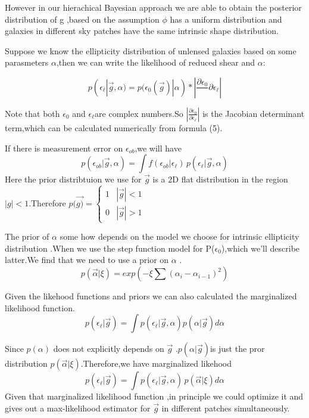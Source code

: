 \documentclass[useAMS,usenatbib]{mn2e}
\begin{document}
However in our hierachical Bayesian approach we are able to obtain
the posterior distribution of g ,based on the assumption $\phi$ has
a uniform distribution and galaxies in different sky patches have
the same intrinsic shape distribution.

Suppose we know the ellipticity distribution of unlensed galaxies
based on some parasmeters $\alpha$,then we can write the likelihood
of reduced shear and $\alpha$:

\begin{equation}
p(\epsilon_{\ell}|\vec{g},\alpha)=p(\epsilon_{0}(\vec{g})|\alpha)*|\frac{\partial\epsilon_{0}}{\,}{\partial\epsilon_{\ell}}|
\end{equation}


Note that both $\epsilon_{0}$ and $\epsilon_{\ell}$are complex numbers.So
$|\frac{\partial\epsilon_{0}}{\partial\epsilon_{\ell}}|$ is the Jacobian
determinant term,which can be calculated numerically from formula
(5).

If there is measurement error on $\epsilon_{ob}$,we will have 
\begin{equation}
p(\epsilon_{ob}|\vec{g},\alpha)=\int f(\epsilon_{ob}|\epsilon_{\ell})\, p(\epsilon_{\ell}|\vec{g},\alpha)
\end{equation}
Here the prior distribtuion we use for $\vec{g}$ is a 2D flat distribution
in the region $|g|<1$.Therefore $p(\vec{g)}=\begin{cases}
1 & |\vec{g}|<1\\
0 & |\vec{g}|>1
\end{cases}$

The prior of $\alpha$ some how depends on the model we choose for
intrinsic ellipticity distribution .When we use the step function
model for P($\epsilon_{0}$),which we'll describe latter.We find that
we need to use a prior on $\alpha$ . 
\begin{equation}
p(\vec{\alpha}|\xi)=exp(-\xi\sum(\alpha_{i}-\alpha_{i-1})^{2})
\end{equation}


Given the likehood functions and priors we can also calculated the
marginalized likelihood function. 
\begin{equation}
p(\epsilon_{\ell}|\vec{g})=\int p(\epsilon_{\ell}|\vec{g},\alpha)p(\alpha|\vec{g})d\alpha
\end{equation}


Since $p(\alpha)$ does not explicitly depends on $\vec{g}$ .$p(\alpha|\vec{g})$is
just the pror distribution $p(\vec{\alpha}|\xi)$.Therefore,we have
marginalized likehood 
\begin{equation}
p(\epsilon_{\ell}|\vec{g})=\int p(\epsilon_{\ell}|\vec{g},\alpha)\, p(\vec{\alpha}|\xi)d\alpha
\end{equation}
Given that marginalized likelihood function ,in principle we could
optimize it and gives out a max-likelihood estimator for $\vec{g}$
in different patches simultaneously.
\end{document}
